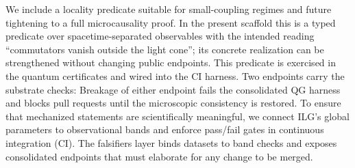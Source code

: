 \documentclass[aps,prd,twocolumn,superscriptaddress,nofootinbib,floatfix,longbibliography]{revtex4-2}
\newcommand{\lean}[1]{\texttt{\detokenize{#1}}}
\begin{document}
We include a locality predicate suitable for small-coupling regimes and future tightening to a full microcausality proof. In the present scaffold this is a typed predicate over spacetime-separated observables with the intended reading ``commutators vanish outside the light cone''; its concrete realization can be strengthened without changing public endpoints. This predicate is exercised in the quantum certificates and wired into the CI harness.
%
Two endpoints carry the substrate checks:
Breakage of either endpoint fails the consolidated QG harness and blocks pull requests until the microscopic consistency is restored.
%
%
%
To ensure that mechanized statements are scientifically meaningful, we connect ILG's global parameters to observational bands and enforce pass/fail gates in continuous integration (CI). The falsifiers layer binds datasets to band checks and exposes consolidated endpoints that must elaborate for any change to be merged.
\end{document}
